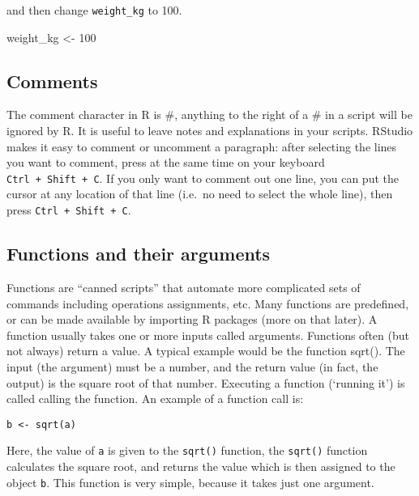 \documentclass[]{book}
\newenvironment{Shaded}{\begin{snugshade}}{\end{snugshade}}
\newcommand{\DecValTok}[1]{\textcolor[rgb]{0.00,0.00,0.81}{#1}}
\newcommand{\NormalTok}[1]{#1}
\newcommand{\StringTok}[1]{\textcolor[rgb]{0.31,0.60,0.02}{#1}}
\begin{document}
and then change \texttt{weight\_kg} to 100.

\begin{Shaded}
\begin{Highlighting}[]
\NormalTok{weight_kg <-}\StringTok{ }\DecValTok{100}
\end{Highlighting}
\end{Shaded}

\hypertarget{comments}{%
\subsection{Comments}\label{comments}}

The comment character in R is \#, anything to the right of a \# in a script will be ignored by R. It is useful to leave notes and explanations in your scripts. RStudio makes it easy to comment or uncomment a paragraph: after selecting the lines you want to comment, press at the same time on your keyboard \texttt{Ctrl\ +\ Shift\ +\ C}. If you only want to comment out one line, you can put the cursor at any location of that line (i.e.~no need to select the whole line), then press \texttt{Ctrl\ +\ Shift\ +\ C}.

\hypertarget{functions-and-their-arguments}{%
\subsection{Functions and their arguments}\label{functions-and-their-arguments}}

Functions are ``canned scripts'' that automate more complicated sets of commands including operations assignments, etc. Many functions are predefined, or can be made available by importing R packages (more on that later). A function usually takes one or more inputs called arguments. Functions often (but not always) return a value. A typical example would be the function sqrt(). The input (the argument) must be a number, and the return value (in fact, the output) is the square root of that number. Executing a function (`running it') is called calling the function. An example of a function call is:

\begin{verbatim}
b <- sqrt(a)
\end{verbatim}

Here, the value of \texttt{a} is given to the \texttt{sqrt()} function, the \texttt{sqrt()} function calculates the square root, and returns the value which is then assigned to the object \texttt{b}. This function is very simple, because it takes just one argument.
\end{document}
